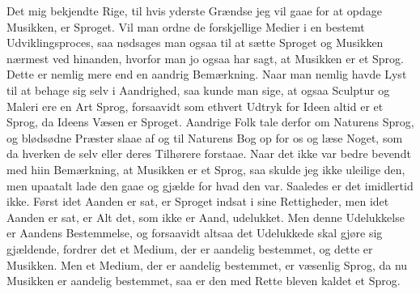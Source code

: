 \documentclass[12pt,a4paper]{article}
\begin{document}
Det mig bekjendte Rige, til hvis yderste Grændse jeg vil gaae for at opdage Musikken, er Sproget. Vil man ordne de forskjellige Medier i en bestemt Udviklingsproces, saa nødsages man ogsaa til at sætte Sproget og Musikken nærmest ved hinanden, hvorfor man jo ogsaa har sagt, at Musikken er et Sprog. Dette er nemlig mere end en aandrig Bemærkning. Naar man nemlig havde Lyst til at behage sig selv i Aandrighed, saa kunde man sige, at ogsaa Sculptur og Maleri ere en Art Sprog, forsaavidt som ethvert Udtryk for Ideen altid er et Sprog, da Ideens Væsen er Sproget. Aandrige Folk tale derfor om Naturens Sprog, og blødsødne Præster slaae af og til Naturens Bog op for os og læse Noget, som da hverken de selv eller deres Tilhørere forstaae. Naar det ikke var bedre bevendt med hiin Bemærkning, at Musikken er et Sprog, saa skulde jeg ikke uleilige den, men upaatalt lade den gaae og gjælde for hvad den var. Saaledes er det imidlertid ikke. Først idet Aanden er sat, er Sproget indsat i sine Rettigheder, men idet Aanden er sat, er Alt det, som ikke er Aand, udelukket. Men denne Udelukkelse er Aandens Bestemmelse, og forsaavidt altsaa det Udelukkede skal gjøre sig gjældende, fordrer det et Medium, der er aandelig bestemmet, og dette er Musikken. Men et Medium, der er aandelig bestemmet, er væsenlig Sprog, da nu Musikken er aandelig bestemmet, saa er den med Rette bleven kaldet et Sprog.
\end{document}
